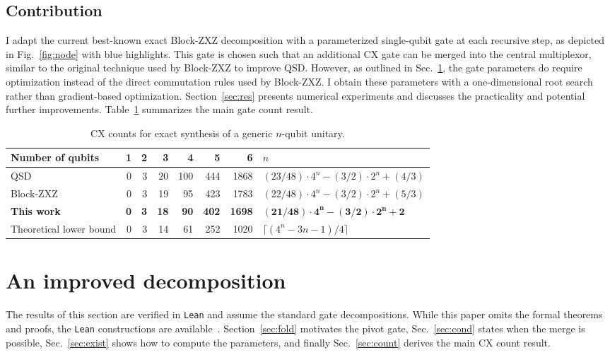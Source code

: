 \documentclass[11pt]{article}
\begin{document}
\subsection{Contribution}

I adapt the current best-known exact Block-ZXZ decomposition with a parameterized single-qubit gate at each recursive step, as depicted in Fig.~\ref{fig:node} with blue highlights. This gate is chosen such that an additional CX gate can be merged into the central multiplexor, similar to the original technique used by Block-ZXZ to improve QSD. However, as outlined in Sec.~\ref{sec:alg}, the gate parameters do require optimization instead of the direct commutation rules used by Block-ZXZ. I obtain these parameters with a one-dimensional root search rather than gradient-based optimization. Section~\ref{sec:res} presents numerical experiments and discusses the practicality and potential further improvements. Table~\ref{tab:counts} summarizes the main gate count result.

\begin{table}[H]
\centering
\begin{tabular}{@{}lrrrrrrl@{}}
\toprule
Number of qubits & 1 & 2 & 3 & 4 & 5 & 6 & $n$\\
\midrule
QSD~\cite{smb} & 0 & 3 & 20 & 100 & 444 & 1868 & $(23/48)\cdot4^n-(3/2)\cdot2^n+(4/3)$\\
Block-ZXZ~\cite{zxz} & 0 & 3 & 19 & 95 & 423 & 1783 & $(22/48)\cdot4^n-(3/2)\cdot2^n+(5/3)$\\
\textbf{This work} & \textbf{0} & \textbf{3} & \textbf{18} & \textbf{90} & \textbf{402} & \textbf{1698} & $\boldsymbol{(21/48)\cdot4^n-(3/2)\cdot2^n+2}$\\
\midrule
Theoretical lower bound & 0 & 3 & 14 & 61 & 252 & 1020 & $\lceil(4^n-3n-1)/4\rceil$\\
\bottomrule
\end{tabular}
\caption{CX counts for exact synthesis of a generic $n$-qubit unitary.}
\label{tab:counts}
\end{table}


\section{An improved decomposition}\label{sec:alg}

The results of this section are verified in \texttt{Lean} and assume the standard gate decompositions. 
While this paper omits the formal theorems and proofs, the \texttt{Lean} constructions are available~\cite{code}.
Section~\ref{sec:fold} motivates the pivot gate, Sec.~\ref{sec:cond} states when the merge is possible,  
Sec.~\ref{sec:exist} shows how to compute the parameters, and finally Sec.~\ref{sec:count} derives the main CX count result. 
\end{document}
